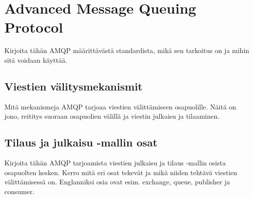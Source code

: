 \section{Advanced Message Queuing Protocol}
\begin{it}
	Kirjoita tähän AMQP määrittävästä standardista, mikä sen tarkoitus on ja mihin sitä voidaan käyttää.
\end{it}

\subsection{Viestien välitysmekanismit}
\begin{it}
	Mitä mekanismeja AMQP tarjoaa viestien välittämiseen osapuolille. Näitä on jono, reititys suoraan osapuolien välillä ja viestin julkaisu ja tilaaminen.
\end{it}

\subsection{Tilaus ja julkaisu -mallin osat}
\begin{it}
	Kirjoita tähän AMQP tarjoamista viestien julkaisu ja tilaus -mallin osista osapuolten kesken. Kerro mitä eri osat tekevät ja mikä niiden tehtävä viestien välittämisessä on. Englanniksi osia ovat esim. exchange, queue, publisher ja consumer.
\end{it}